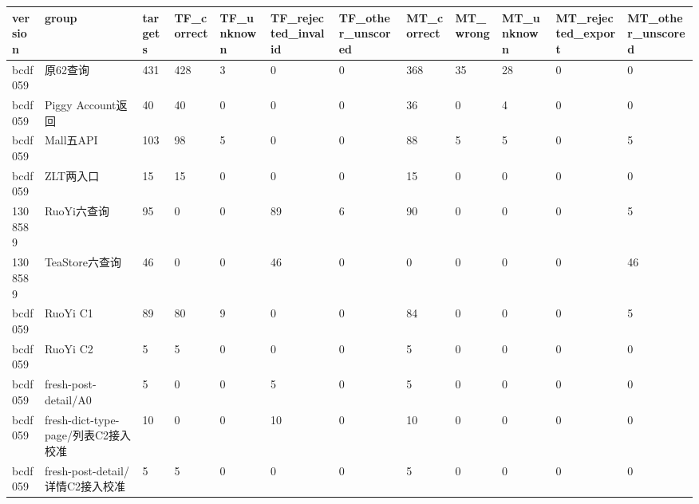 \begin{tabular}{llllllllllll}
\hline
version & group & targets & TF\_correct & TF\_unknown & TF\_rejected\_invalid & TF\_other\_unscored & MT\_correct & MT\_wrong & MT\_unknown & MT\_rejected\_export & MT\_other\_unscored \\
\hline
bcdf059 & 原62查询 & 431 & 428 & 3 & 0 & 0 & 368 & 35 & 28 & 0 & 0 \\
bcdf059 & Piggy Account返回 & 40 & 40 & 0 & 0 & 0 & 36 & 0 & 4 & 0 & 0 \\
bcdf059 & Mall五API & 103 & 98 & 5 & 0 & 0 & 88 & 5 & 5 & 0 & 5 \\
bcdf059 & ZLT两入口 & 15 & 15 & 0 & 0 & 0 & 15 & 0 & 0 & 0 & 0 \\
1308589 & RuoYi六查询 & 95 & 0 & 0 & 89 & 6 & 90 & 0 & 0 & 0 & 5 \\
1308589 & TeaStore六查询 & 46 & 0 & 0 & 46 & 0 & 0 & 0 & 0 & 0 & 46 \\
bcdf059 & RuoYi C1 & 89 & 80 & 9 & 0 & 0 & 84 & 0 & 0 & 0 & 5 \\
bcdf059 & RuoYi C2 & 5 & 5 & 0 & 0 & 0 & 5 & 0 & 0 & 0 & 0 \\
bcdf059 & fresh-post-detail/A0 & 5 & 0 & 0 & 5 & 0 & 5 & 0 & 0 & 0 & 0 \\
bcdf059 & fresh-dict-type-page/列表C2接入校准 & 10 & 0 & 0 & 10 & 0 & 10 & 0 & 0 & 0 & 0 \\
bcdf059 & fresh-post-detail/详情C2接入校准 & 5 & 5 & 0 & 0 & 0 & 5 & 0 & 0 & 0 & 0 \\
\hline
\end{tabular}
